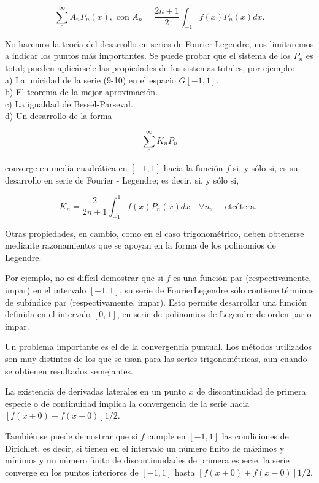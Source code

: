 \documentclass[10pt]{article}
\theoremstyle{plain}
\theoremstyle{definition}
\theoremstyle{remark}
\begin{document}
\begin{equation*}
\sum_{0}^{\infty} A_{n} P_{n}(x), \text { con } A_{n}=\frac{2 n+1}{2} \int_{-1}^{1} f(x) P_{n}(x) d x . \tag{9-10}
\end{equation*}


No haremos la teoría del desarrollo en series de Fourier-Legendre, nos limitaremos a indicar los puntos más importantes. Se puede probar que el sistema de los $P_{n}$ es total; pueden aplicársele las propiedades de los sistemas totales, por ejemplo:\\
a) La unicidad de la serie (9-10) en el espacio $G[-1,1]$.\\
b) El teorema de la mejor aproximación.\\
c) La igualdad de Bessel-Parseval.\\
d) Un desarrollo de la forma

$$
\sum_{0}^{\infty} K_{n} P_{n}
$$

converge en media cuadrática en $[-1,1]$ hacia la función $f$ si, y sólo si, es su desarrollo en serie de Fourier - Legendre; es decir, si, y sólo si,

$$
K_{n}=\frac{2}{2 n+1} \int_{-1}^{1} f(x) P_{n}(x) d x \quad \forall n, \quad \text { etcétera. }
$$

Otras propiedades, en cambio, como en el caso trigonométrico, deben obtenerse mediante razonamientos que se apoyan en la forma de los polinomios de Legendre.

Por ejemplo, no es difícil demostrar que si $f$ es una función par (respectivamente, impar) en el intervalo $[-1,1]$, su serie de FourierLegendre sólo contiene términos de subíndice par (respectivamente, impar). Esto permite desarrollar una función definida en el intervalo $[0,1]$, en serie de polinomios de Legendre de orden par o impar.

Un problema importante es el de la convergencia puntual. Los métodos utilizados son muy distintos de los que se usan para las series trigonométricas, aun cuando se obtienen resultados semejantes.

La existencia de derivadas laterales en un punto $x$ de discontinuidad de primera especie o de continuidad implica la convergencia de la serie hacia $[f(x+0)+f(x-0)] 1 / 2$.

También se puede demostrar que si $f$ cumple en $[-1,1]$ las condiciones de Dirichlet, es decir, si tienen en el intervalo un número finito de máximos y mínimos y un número finito de discontinuidades de primera especie, la serie converge en los puntos interiores de $[-1,1]$ hasta $[f(x+0)+f(x-0)] 1 / 2$.
\end{document}
